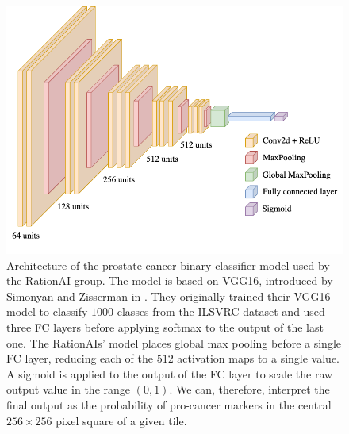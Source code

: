 \begin{figure}
    \begin{center}
    \begin{minipage}{0.75\textwidth}
      \includegraphics[width=\textwidth]{img/nn-arch.png}
    \end{minipage}
    \caption{Architecture of the prostate cancer binary classifier model used by the RationAI group. The model is based on VGG16, introduced by Simonyan and Zisserman in \cite{vgg16}. They originally trained their VGG16 model to classify $1000$ classes from the ILSVRC dataset \cite{ilsvrc} and used three FC layers before applying softmax to the output of the last one. The RationAIs' model places global max pooling before a single FC layer, reducing each of the $512$ activation maps to a single value. A sigmoid is applied to the output of the FC layer to scale the raw output value in the range $(0, 1)$. We can, therefore, interpret the final output as the probability of pro-cancer markers in the central $256 \times 256$ pixel square of a given tile.}
    \label{fig:rationai-vgg16}
    \end{center}
\end{figure}

